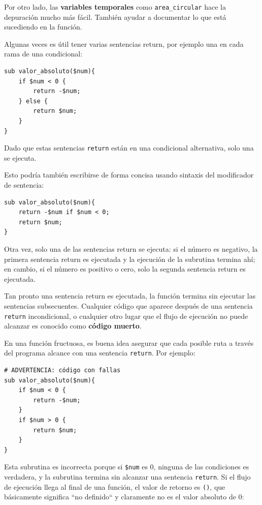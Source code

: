 Por otro lado, las {\bf variables temporales} 
como \verb|area_circular| hace la depuración mucho más
fácil. También ayudar a documentar lo que está sucediendo
en la función.

Algunas veces es útil tener varias sentencias return, por 
ejemplo una en cada rama de una condicional:

\begin{lstlisting}
sub valor_absoluto($num){
    if $num < 0 {
        return -$num;
    } else {
        return $num;
    }
}
\end{lstlisting}
%
Dado que estas sentencias {\tt return} están en una 
condicional alternativa, solo una se ejecuta.

Esto podría también escribirse de forma concisa usando sintaxis 
del modificador de sentencia:

\begin{lstlisting}
sub valor_absoluto($num){
    return -$num if $num < 0;
    return $num;
}
\end{lstlisting}
%
Otra vez, solo una de las sentencias return se ejecuta: si el 
número es negativo, la primera sentencia return es ejecutada
y la ejecución de la subrutina termina ahí; en cambio, si el
número es positivo o cero, solo la segunda sentencia return 
es ejecutada.

Tan pronto una sentencia return es ejecutada, la función termina
sin ejecutar las sentencias subsecuentes. Cualquier código que aparece
después de una sentencia {\tt return} incondicional, o cualquier
otro lugar que el flujo de ejecución no puede alcanzar es 
conocido como {\bf código muerto}. 

En una función fructuosa, es buena idea asegurar que cada
posible ruta a través del programa alcance con una sentencia
{\tt return}. Por ejemplo:

\begin{lstlisting}
# ADVERTENCIA: código con fallas
sub valor_absoluto($num){
    if $num < 0 {
        return -$num;
    } 
    if $num > 0 {
        return $num;
    }
}
\end{lstlisting}
%

Esta subrutina es incorrecta porque si {\tt \$num} es 0, 
ninguna de las condiciones es verdadera, y la subrutina termina 
sin alcanzar una sentencia {\tt return}. Si el flujo de ejecución
llega al final de una función, el valor de retorno es {\tt ()}, que básicamente
significa ``no definido`` y claramente no es el valor absoluto de 0:

